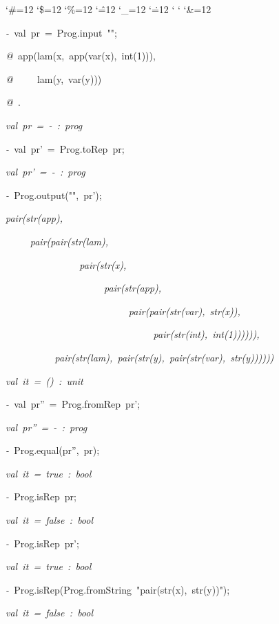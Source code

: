 \begin{list}{}
{\setlength{\leftmargin}{\leftmargini}
\setlength{\rightmargin}{0cm}
\setlength{\itemindent}{0cm}
\setlength{\listparindent}{0cm}
\setlength{\itemsep}{0cm}
\setlength{\parsep}{0cm}
\setlength{\labelsep}{0cm}
\setlength{\labelwidth}{0cm}
\catcode`\#=12
\catcode`\$=12
\catcode`\%=12
\catcode`\^=12
\catcode`\_=12
\catcode`\.=12
\catcode`
\catcode`
\catcode`\&=12
\ttfamily}
\small
\item[]\textsl{-\ }val\ pr\ =\ Prog.input\ "";
\item[]\textsl{@\ }app(lam(x,\ app(var(x),\ int(1))),
\item[]\textsl{@\ }\ \ \ \ lam(y,\ var(y)))
\item[]\textsl{@\ }.
\item[]\textsl{val\ pr\ =\ -\ :\ prog}
\item[]\textsl{-\ }val\ pr'\ =\ Prog.toRep\ pr;
\item[]\textsl{val\ pr'\ =\ -\ :\ prog}
\item[]\textsl{-\ }Prog.output("",\ pr');
\item[]\textsl{pair(str(app),}
\item[]\textsl{\ \ \ \ \ pair(pair(str(lam),}
\item[]\textsl{\ \ \ \ \ \ \ \ \ \ \ \ \ \ \ pair(str(x),}
\item[]\textsl{\ \ \ \ \ \ \ \ \ \ \ \ \ \ \ \ \ \ \ \ pair(str(app),}
\item[]\textsl{\ \ \ \ \ \ \ \ \ \ \ \ \ \ \ \ \ \ \ \ \ \ \ \ \ pair(pair(str(var),\ str(x)),}
\item[]\textsl{\ \ \ \ \ \ \ \ \ \ \ \ \ \ \ \ \ \ \ \ \ \ \ \ \ \ \ \ \ \ pair(str(int),\ int(1)))))),}
\item[]\textsl{\ \ \ \ \ \ \ \ \ \ pair(str(lam),\ pair(str(y),\ pair(str(var),\ str(y))))))}
\item[]\textsl{val\ it\ =\ ()\ :\ unit}
\item[]\textsl{-\ }val\ pr''\ =\ Prog.fromRep\ pr';
\item[]\textsl{val\ pr''\ =\ -\ :\ prog}
\item[]\textsl{-\ }Prog.equal(pr'',\ pr);
\item[]\textsl{val\ it\ =\ true\ :\ bool}
\item[]\textsl{-\ }Prog.isRep\ pr;
\item[]\textsl{val\ it\ =\ false\ :\ bool}
\item[]\textsl{-\ }Prog.isRep\ pr';
\item[]\textsl{val\ it\ =\ true\ :\ bool}
\item[]\textsl{-\ }Prog.isRep(Prog.fromString\ "pair(str(x),\ str(y))");
\item[]\textsl{val\ it\ =\ false\ :\ bool}
\end{list}
